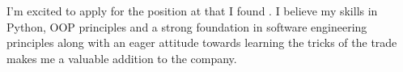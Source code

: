 



I'm excited to apply for the \position\;position at \company\;that I found \source. 
I believe my skills in Python, OOP principles and a strong foundation in software engineering principles along with an eager attitude towards learning the tricks of the trade makes me a valuable addition to the company.